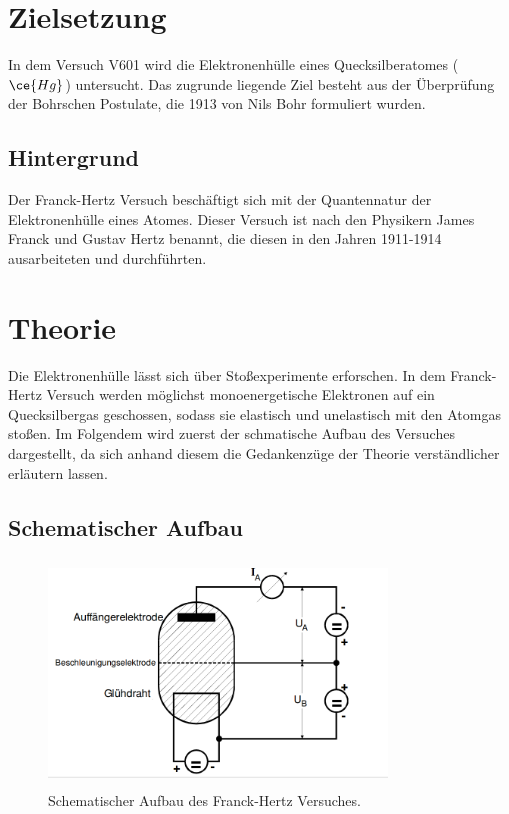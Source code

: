 \section{Zielsetzung}

In dem Versuch V601 wird die Elektronenhülle eines Quecksilberatomes ($\ce{Hg}$)
untersucht. Das zugrunde liegende Ziel besteht aus der Überprüfung der Bohrschen
Postulate, die 1913 von Nils Bohr formuliert wurden.

\subsection{Hintergrund}

Der Franck-Hertz Versuch beschäftigt sich mit der Quantennatur der
Elektronenhülle eines Atomes. Dieser Versuch
ist nach den Physikern James Franck und Gustav Hertz benannt, die diesen
in den Jahren 1911-1914 ausarbeiteten und durchführten.

\section{Theorie}

Die Elektronenhülle lässt sich über Stoßexperimente erforschen. In dem
Franck-Hertz Versuch werden möglichst monoenergetische Elektronen
auf ein Quecksilbergas geschossen, sodass sie elastisch und unelastisch
mit den Atomgas stoßen.
Im Folgendem wird zuerst der schmatische Aufbau des Versuches dargestellt, da sich anhand
diesem die Gedankenzüge der Theorie verständlicher erläutern lassen.

\subsection{Schematischer Aufbau}

\begin{figure}
  \centering
  \includegraphics[width=9cm, height=6cm]{Pics/schematisch_Franck_Hertz.png}
  \caption{Schematischer Aufbau des Franck-Hertz Versuches.\cite{anleitung01}}
  \label{fig:schmeatisch_Franck_Hertz}
\end{figure}

